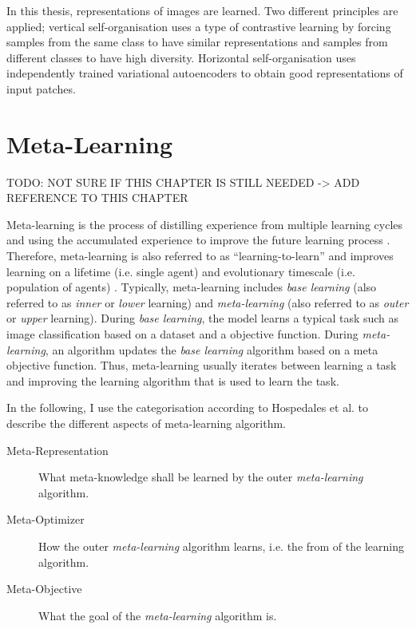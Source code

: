 In this thesis, representations of images are learned.
Two different principles are applied;
vertical self-organisation uses a type of contrastive learning by forcing samples from the same class to have similar representations and samples from different classes to have high diversity.
Horizontal self-organisation uses independently trained variational autoencoders to obtain good representations of input patches.


\section{Meta-Learning}
TODO: NOT SURE IF THIS CHAPTER IS STILL NEEDED -> ADD REFERENCE TO THIS CHAPTER

Meta-learning is the process of distilling experience from multiple learning cycles and using the accumulated experience to improve the future learning process .
Therefore, meta-learning is also referred to as ``learning-to-learn''  and improves learning on a lifetime (i.e. single agent) and evolutionary timescale (i.e. population of agents) .
Typically, meta-learning includes \emph{base learning} (also referred to as \emph{inner} or \emph{lower} learning) and \emph{meta-learning} (also referred to as \emph{outer} or \emph{upper} learning).
During \emph{base learning}, the model learns a typical task such as image classification based on a dataset and a objective function.
During \emph{meta-learning}, an algorithm updates the \emph{base learning} algorithm based on a meta objective function.
Thus, meta-learning usually iterates between learning a task and improving the learning algorithm that is used to learn the task.

In the following, I use the categorisation according to Hospedales et al. \cite{Hospedales_Antoniou_Micaelli_Storkey_2021} to describe the different aspects of meta-learning algorithm.
\begin{description}
   \item[Meta-Representation] What meta-knowledge shall be learned by the outer \emph{meta-learning} algorithm.
   \item[Meta-Optimizer] How the outer \emph{meta-learning} algorithm learns, i.e. the from of the learning algorithm.
   \item[Meta-Objective] What the goal of the \emph{meta-learning} algorithm is.
\end{description}

